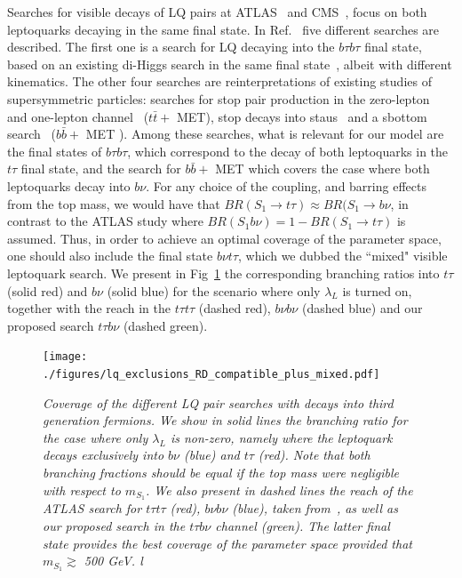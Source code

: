 \documentclass[11pt]{cernrep}
\begin{document}
Searches for visible decays of LQ pairs at ATLAS~\cite{Aad:2015caa,Aaboud:2019jcc,Aaboud:2019bye} and CMS~\cite{Sirunyan:2018nkj,Sirunyan:2018kzh,Sirunyan:2018vhk}, focus on both leptoquarks decaying in the same final state. In Ref.~\cite{Aaboud:2019bye} five different searches are described. The first one is a search for LQ decaying into the $b \tau b \tau$ final state, based on an existing di-Higgs search in the same final state~\cite{Aaboud:2018sfw}, albeit with different kinematics. The other four searches are reinterpretations of existing studies of supersymmetric particles: searches for stop pair production in the zero-lepton~\cite{Aaboud:2017ayj} and one-lepton channel~\cite{Aaboud:2017aeu} ($t \bar{t} +$ MET), stop decays into staus~\cite{Aaboud:2018kya} and a sbottom search~\cite{Aaboud:2017wqg} ($b\bar{b} + $ MET ). Among these searches, what is relevant for our model are the final states of $b \tau b \tau$, which correspond to the decay of both leptoquarks in the $t \tau$ final state, and the search for $b \bar{b} +$ MET  which covers the case where both leptoquarks decay into $b \nu$. For any choice of the coupling, and barring effects from the top mass, we would have that $BR (S_1 \to t \tau) \approx BR (S_1 \to b \nu$, in contrast to the ATLAS study where $BR(S_1 b \nu) = 1 - BR(S_1 \to t \tau)$ is assumed. Thus, in order to achieve an optimal coverage of the parameter space, one should also include the final state $b \nu t \tau$, which we dubbed the ``mixed" visible leptoquark search. We present in Fig~\ref{fig:LQpaircoverage} the corresponding branching ratios into $t \tau$ (solid red) and $b \nu$ (solid blue) for the scenario where only $\lambda_L$ is turned on, together with the reach in the $t \tau t \tau$ (dashed red), $b \nu b \nu$ (dashed blue) and our proposed search $t \tau b \nu$ (dashed green).
 \begin{figure}[!htp]
  \centering
  \texttt{[image: ./figures/lq\_exclusions\_RD\_compatible\_plus\_mixed.pdf]} 
  \caption{\it Coverage of the different LQ pair searches with decays into third generation fermions. We show in solid lines the branching ratio for the case where only $\lambda_L$ is non-zero, namely where the leptoquark decays exclusively into $b \nu$ (blue) and $t \tau$ (red). Note that both branching fractions should be equal if the top mass were negligible with respect to $m_{S_1}$. We also present in dashed lines the reach of the ATLAS search for $t \tau t \tau$ (red), $b \nu b \nu$ (blue), taken from~\cite{Aaboud:2019bye}, as well as our proposed search in the $t \tau b \nu$ channel (green). The latter final state provides the best coverage of the parameter space provided that $m_{S_1} \gtrsim$ 500 GeV. l}
\label{fig:LQpaircoverage}
\end{figure}
\end{document}
